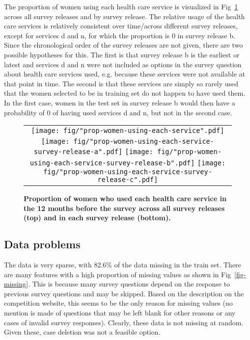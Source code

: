 \documentclass{article}\usepackage[]{graphicx}\usepackage[]{color}
\begin{document}
The proportion of women using each health care service is visualized in Fig~\ref{fig-prop-svcs} across all survey releases and by survey release. The relative usage of the health care services is relatively consistent over time/across different survey releases, except for services d and n, for which the proportion is 0 in survey release b. Since the chronological order of the survey releases are not given, there are two possible hypotheses for this. The first is that survey release b is the earliest or latest and services d and n were not included as options in the survey question about health care services used, e.g. because these services were not available at that point in time. The second is that these services are simply so rarely used that the women selected to be in training set do not happen to have used them. In the first case, women in the test set in survey release b would then have a probability of 0 of having used services d and n, but not in the second case.

\begin{figure}[htbp]
\begin{center}
\begin{tabular}{c}
\texttt{[image: fig/"prop-women-using-each-service".pdf]} \\
\texttt{[image: fig/"prop-women-using-each-service-survey-release-a".pdf]}
\texttt{[image: fig/"prop-women-using-each-service-survey-release-b".pdf]}
\texttt{[image: fig/"prop-women-using-each-service-survey-release-c".pdf]}
\end{tabular}
\caption{\textbf{Proportion of women who used each health care service in the 12 months before the survey across all survey releases (top) and in each survey release (bottom).}}
\label{fig-prop-svcs}
\end{center}
\end{figure}

\subsection{Data problems}
The data is very sparse, with 82.6\% of the data missing in the train set. There are many features with a high proportion of missing values as shown in Fig~\ref{fig-missing}. This is because many survey questions depend on the response to previous survey questions and may be skipped. Based on the description on the competition website, this seems to be the only reason for missing values (no mention is made of questions that may be left blank for other reasons or any cases of invalid survey responses). Clearly, these data is not missing at random. Given these, case deletion was not a feasible option.
\end{document}
